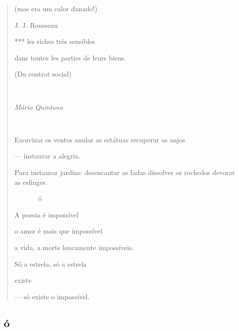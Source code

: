 \begin{quote}
(mas era um calor danado!)

J. J. Rousseau

*** les riches très sensibles

dans toutes les parties de leurs biens.

(Du contrat social)

 

\emph{Mário Quintana}



Exorcizar os ventos anular as estátuas recuperar os anjos

--- instaurar a alegria.

Para instaurar jardins: desencantar as fadas dissolver os rochedos
devorar as esfinges.

  ó

A poesia é impossível

o amor é mais que impossível

a vida, a morte loucamente impossíveis.

Só a estrela, só a estrela

existe

--- só existe o impossível.
\end{quote}

\subsection{ó}\label{section-6}


